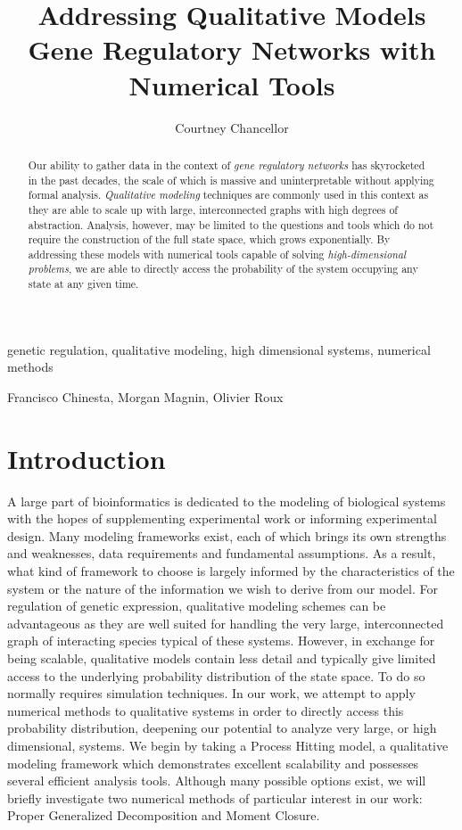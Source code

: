 \documentclass[en]{jdoc}
\title{Addressing Qualitative Models Gene Regulatory Networks with Numerical Tools}
\author{Courtney Chancellor}
\begin{document}
\makehead
 
 \begin{abstract}
 Our ability to gather data in the context of \textit{gene regulatory networks} has skyrocketed in the past decades, 
the scale of which is massive and uninterpretable without applying formal analysis. \textit{Qualitative modeling} techniques are commonly used in this context as they are able to scale up with large, interconnected graphs with high degrees of abstraction. Analysis, however, may be limited to the questions and tools which do not require the construction of the full state space, which grows exponentially. By addressing these models with numerical tools capable of solving \textit{high-dimensional problems}, we are able to directly access the probability of the system occupying any state at any given time.
\end{abstract}

\begin{keywords}
 genetic regulation, 
 qualitative modeling, 
 high dimensional systems, 
 numerical methods
\end{keywords}

\begin{collaborations}
Francisco Chinesta,
Morgan Magnin,
Olivier Roux
\end{collaborations}

\section{Introduction}

  A large part of bioinformatics is dedicated to the modeling of biological systems with the hopes of supplementing experimental work or informing experimental design. Many modeling frameworks exist, each of which brings its own strengths and weaknesses, data requirements and fundamental assumptions. As a result, what kind of framework to choose is largely informed by the characteristics of the system or the nature of the information we wish to derive from our model. For regulation of genetic expression, qualitative modeling schemes can be advantageous as they are well suited for handling the very large, interconnected graph of interacting species typical of these systems. However, in exchange for being scalable, qualitative models contain less detail and typically give limited access to the underlying probability distribution of the state space. To do so normally requires simulation techniques. In our work, we attempt to apply numerical methods to qualitative systems in order to directly access this probability distribution, deepening our potential to analyze very large, or high dimensional, systems. We begin by taking a Process Hitting \cite{FPIMR12-CMSB, pauleve2011tuning} model, a qualitative modeling framework which demonstrates excellent scalability and possesses several efficient analysis tools. Although many possible options exist, we will briefly investigate two numerical methods of particular interest in our work: Proper Generalized Decomposition and Moment Closure.
  
\end{document}
